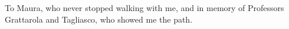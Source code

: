 
\begin{dedication}
To Maura, who never stopped walking with me, and in memory of Professors Grattarola and Tagliasco, who showed me the path.
\end{dedication}




